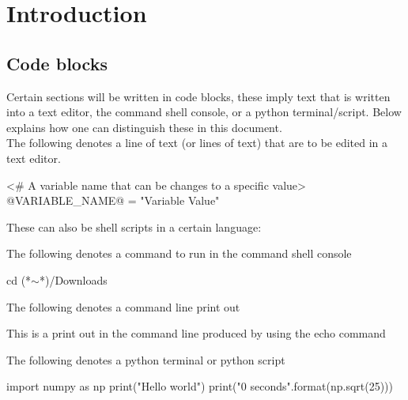 \chapter{Introduction}
\label{chapter:intro}



\section{Code blocks}
\label{ch:intro:codeblocks}

Certain sections will be written in code blocks, these imply text that is written into a text editor, the command shell console, or a python terminal/script. Below explains how one can distinguish these in this document. \\

\noindent The following denotes a line of text (or lines of text) that are to be edited in a text editor.
\begin{textbox}
<# A variable name that can be changes to a specific value>
@VARIABLE_NAME@ = "Variable Value"
\end{textbox}
\vspace{0.5cm}

\noindent These can also be shell scripts in a certain language:
\vspace{0.5cm}

\noindent The following denotes a command to run in the command shell console 
\begin{cmdbox}
cd (*$\sim$*)/Downloads
\end{cmdbox}
\vspace{0.5cm}

\noindent The following denotes a command line print out
\begin{cmdboxprint}
 This is a print out in the command line
 produced by using the echo command
\end{cmdboxprint}
\vspace{0.5cm}

\noindent The following denotes a python terminal or python script
\begin{pythonbox}
import numpy as np
print("Hello world")
print("{0} seconds".format(np.sqrt(25)))
\end{pythonbox}
\vspace{0.5cm}